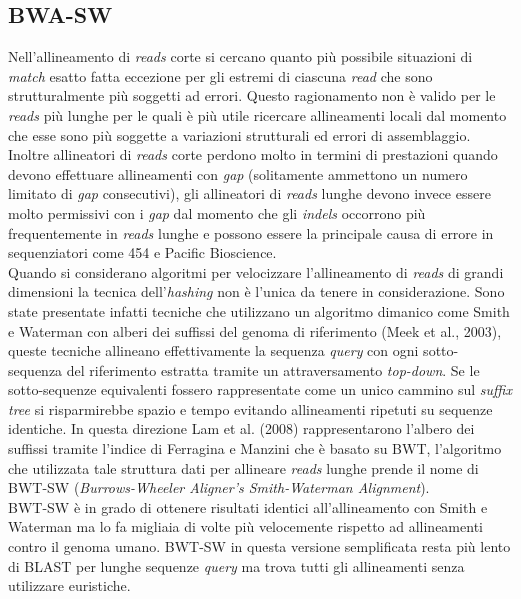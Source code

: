 \documentclass[conference]{IEEEtran}
\begin{document}
\subsection{BWA-SW}
Nell'allineamento di \textit{reads} corte si cercano quanto più possibile situazioni di \textit{match} esatto fatta eccezione per gli estremi di ciascuna \textit{read} che sono strutturalmente più soggetti ad errori. Questo ragionamento non è valido per le \textit{reads} più lunghe per le quali è più utile ricercare allineamenti locali dal momento che esse sono più soggette a variazioni strutturali ed errori di assemblaggio. Inoltre allineatori di \textit{reads} corte perdono molto in termini di prestazioni quando devono effettuare allineamenti con \textit{gap} (solitamente ammettono un numero limitato di \textit{gap} consecutivi), gli allineatori di \textit{reads} lunghe devono invece essere molto permissivi con i \textit{gap} dal momento che gli \textit{indels} occorrono più frequentemente in \textit{reads} lunghe e possono essere la principale causa di errore in sequenziatori come 454 e Pacific Bioscience.\\

Quando si considerano algoritmi per velocizzare l'allineamento di \textit{reads} di grandi dimensioni la tecnica dell'\textit{hashing} non è l'unica da tenere in considerazione. Sono state presentate infatti tecniche che utilizzano un algoritmo dimanico come Smith e Waterman con alberi dei suffissi del genoma di riferimento (Meek et al., 2003), queste tecniche allineano effettivamente la sequenza \textit{query} con ogni sotto-sequenza del riferimento estratta tramite un attraversamento \textit{top-down}. Se le sotto-sequenze equivalenti fossero rappresentate come un unico cammino sul \textit{suffix tree} si risparmirebbe spazio e tempo evitando allineamenti ripetuti su sequenze identiche. In questa direzione Lam et al. (2008) rappresentarono l'albero dei suffissi tramite l'indice di Ferragina e Manzini che è basato su BWT, l'algoritmo che utilizzata tale struttura dati per allineare \textit{reads} lunghe prende il nome di BWT-SW (\textit{Burrows-Wheeler Aligner’s Smith-Waterman Alignment}).\\
BWT-SW è in grado di ottenere risultati identici all'allineamento con Smith e Waterman ma lo fa migliaia di volte più velocemente rispetto ad allineamenti contro il genoma umano. BWT-SW in questa versione semplificata resta più lento di BLAST per lunghe sequenze \textit{query} ma trova tutti gli allineamenti senza utilizzare euristiche.\\
\end{document}
